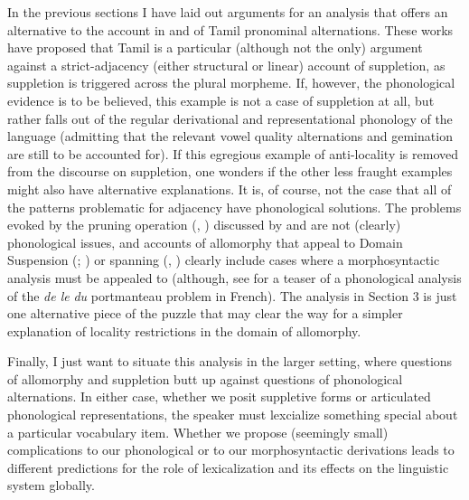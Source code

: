 \documentclass[output=paper,colorlinks,citecolor=brown,
]{langscibook}
\begin{document}
In the previous sections I have laid out arguments for an analysis that offers an alternative to the account in \citet{Moskal2015} and \citet{moskal2016towards} of Tamil pronominal alternations. These works have proposed that Tamil is a particular (although not the only) argument against a strict-adjacency (either structural or linear) account of suppletion, as suppletion is triggered across the plural morpheme. If, however, the phonological evidence is to be believed, this example is not a case of suppletion at all, but rather falls out of the regular derivational and representational phonology of the language (admitting that the relevant vowel quality alternations and gemination are still to be accounted for). If this egregious example of anti-locality is removed from the discourse on suppletion, one wonders if the other less fraught examples might also have alternative explanations. It is, of course, not the case that all of the patterns problematic for adjacency have phonological solutions. The  problems evoked by the pruning operation (\citealt{Embick2003}, \citeyear{embick2010localism}) discussed by \citet{Moskal2015} and \citet{moskal2016towards} are not (clearly) phonological issues, and accounts of allomorphy that appeal to Domain Suspension (\citealt{bobaljik2012universals}; \citealt{BobaljikWurmbrand2013}) or spanning (\citealt{Merchant2015}, \citet{svenonius2016spans}) clearly include cases where a morphosyntactic analysis must be appealed to (although, see \citet{newell2018re} for a teaser of a phonological analysis of the\textit{ de le} \rightarrow \textit{du} portmanteau problem in French). The analysis in Section 3 is just one alternative piece of the puzzle that may clear the way for a simpler explanation of locality restrictions in the domain of allomorphy.

Finally, I just want to situate this analysis in the larger setting, where questions of allomorphy and suppletion butt up against questions of phonological alternations. In either case, whether we posit suppletive forms or articulated phonological representations, the speaker must lexcialize something special about a particular vocabulary item. Whether we propose (seemingly small) complications to our phonological or to our morphosyntactic derivations leads to different predictions for the role of lexicalization and its effects on the linguistic system globally.
\end{document}
